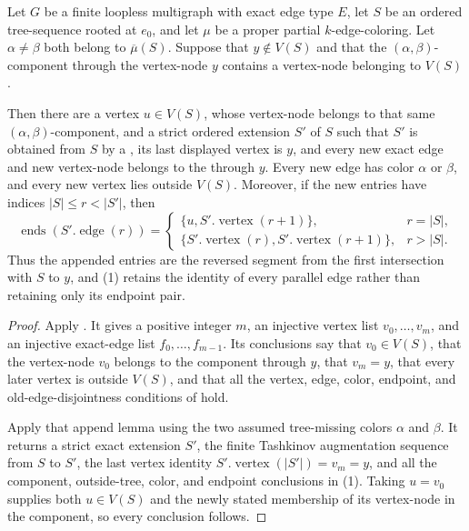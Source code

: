 \begin{lemma}
Let \(G\) be a finite loopless multigraph with exact edge type \(E\), let
\(S\) be an ordered tree-sequence rooted at \(e_0\), and let \(\mu\) be a
proper partial \(k\)-edge-coloring.  Let \(\alpha\ne\beta\) both belong to
\(\overline\mu(S)\).  Suppose that \(y\notin V(S)\) and that the
\((\alpha,\beta)\)-component through the vertex-node \(y\) contains a
vertex-node belonging to \(V(S)\).

Then there are a vertex \(u\in V(S)\), whose vertex-node belongs to that
same \((\alpha,\beta)\)-component, and a strict ordered extension
\(S'\) of \(S\) such that \(S'\) is obtained from \(S\) by a
, its last displayed vertex is
\(y\), and every new exact edge and new vertex-node belongs to the
 through \(y\).  Every new edge has color
\(\alpha\) or \(\beta\), and every new vertex lies outside \(V(S)\).
Moreover, if the new entries have indices \(|S|\le r<|S'|\), then
\[
 \operatorname{ends}(S'.\operatorname{edge}(r))=
 \begin{cases}
   \{u,S'.\operatorname{vertex}(r+1)\},&r=|S|,\\
   \{S'.\operatorname{vertex}(r),S'.\operatorname{vertex}(r+1)\},
       &r>|S|.
 \end{cases}                                                \tag{1}
\]
Thus the appended entries are the reversed segment from the first
intersection with \(S\) to \(y\), and (1) retains the identity of every
parallel edge rather than retaining only its endpoint pair.
\end{lemma}
\begin{proof}
Apply .  It gives a positive
integer \(m\), an injective vertex list
\(v_0,\ldots,v_m\), and an injective exact-edge list
\(f_0,\ldots,f_{m-1}\).  Its conclusions say that \(v_0\in V(S)\), that
the vertex-node \(v_0\) belongs to the component through \(y\), that
\(v_m=y\), that every later vertex is outside \(V(S)\), and that all the
vertex, edge, color, endpoint, and old-edge-disjointness conditions of
 hold.

Apply that append lemma using the two assumed tree-missing colors
\(\alpha\) and \(\beta\).  It returns a strict exact extension \(S'\),
the finite Tashkinov augmentation sequence from \(S\) to \(S'\), the last
vertex identity \(S'.\operatorname{vertex}(|S'|)=v_m=y\), and all the
component, outside-tree, color, and endpoint conclusions in (1).  Taking
\(u=v_0\) supplies both \(u\in V(S)\) and the newly stated membership of
its vertex-node in the component, so every conclusion follows.
\end{proof}
